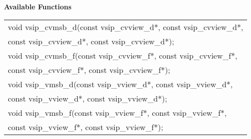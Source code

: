\cvsiplh
\newline \hspace*{.8cm} \vspace*{.1cm} \textbf{Available Functions }
\newline \hspace*{1.1cm} {
\ttfamily
\begin{tabular}[H]{l}
void vsip\_cvmsb\_d(const vsip\_cvview\_d*, const vsip\_cvview\_d*,\\*\hspace{.7cm}const vsip\_cvview\_d*, const vsip\_cvview\_d*);\\
void vsip\_cvmsb\_f(const vsip\_cvview\_f*, const vsip\_cvview\_f*,\\*\hspace{.7cm}const vsip\_cvview\_f*, const vsip\_cvview\_f*); \\
void vsip\_vmsb\_d(const vsip\_vview\_d*, const vsip\_vview\_d*,\\*\hspace{.7cm}const vsip\_vview\_d*, const vsip\_vview\_d*); \\
void vsip\_vmsb\_f(const vsip\_vview\_f*, const vsip\_vview\_f*,\\*\hspace{.7cm}const vsip\_vview\_f*, const vsip\_vview\_f*); \\
\end{tabular}
}
\pyjvsiph
{}
